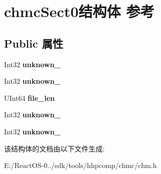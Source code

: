 \hypertarget{structchmc_sect0}{}\section{chmc\+Sect0结构体 参考}
\label{structchmc_sect0}
\subsection*{Public 属性}
\begin{DoxyCompactItemize}
\item 
\mbox{\label{structchmc_sect0_a8c698d51033ad6312ffd1c59490eb470}} 
Int32 {\bfseries unknown\+\_}
\item 
\mbox{\label{structchmc_sect0_af45fd1adaffbe6a6a1678a60f7df1e48}} 
Int32 {\bfseries unknown\+\_}
\item 
\mbox{\label{structchmc_sect0_a134b66d7fde3bad093d33cd867170993}} 
U\+Int64 {\bfseries file\+\_\+len}
\item 
\mbox{\label{structchmc_sect0_a338fd42d4225699a96288a99da6f7c87}} 
Int32 {\bfseries unknown\+\_}
\item 
\mbox{\label{structchmc_sect0_aeb0648f0ca22077ec681ef5d8f9a0f2c}} 
Int32 {\bfseries unknown\+\_}
\end{DoxyCompactItemize}


该结构体的文档由以下文件生成\+:\begin{DoxyCompactItemize}
\item 
E\+:/\+React\+O\+S-\/0../sdk/tools/hhpcomp/chmc/chm.\+h\end{DoxyCompactItemize}
